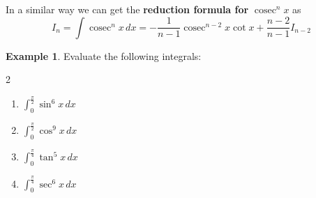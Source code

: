 \documentclass{book}
\DeclareMathOperator{\cosec}{cosec}
\theoremstyle{definition}
\newtheorem{example}{Example}[section]
\begin{document}
In a similar way we can get the \textbf{reduction formula for} $\cosec^nx$ as 
\[
I_n=\int\cosec^n x\,dx=-\frac{1}{{n-1}}\cosec^{n-2}x\cot x+\frac{n-2}{n-1}I_{n-2}
\]



\begin{example}
 Evaluate the following integrals:
\begin{multicols}{2}
\begin{enumerate}[label=(\roman*)]
    \item $\displaystyle\int_0^{\frac{\pi}{2}}\sin^6x\,dx$
    \item $\displaystyle\int_0^{\frac{\pi}{2}}\cos^9x\,dx$
    \item $\displaystyle\int_0^{\frac{\pi}{4}}\tan^5x\,dx$
    \item $\displaystyle\int_0^{\frac{\pi}{4}}\sec^6x\,dx$

\end{enumerate}
\end{multicols}
\end{example}
\end{document}
